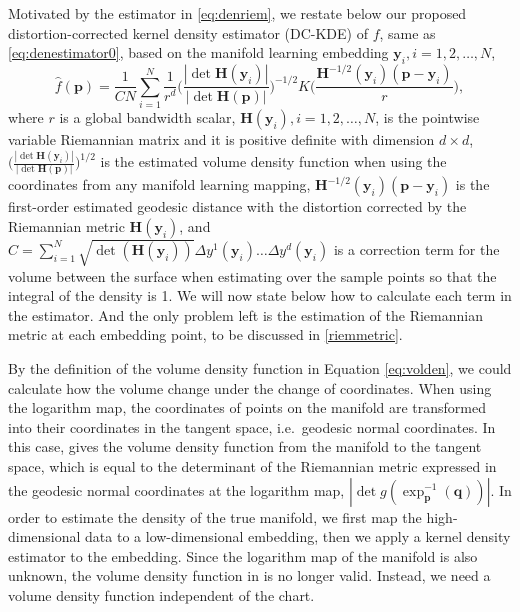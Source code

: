 \documentclass[11pt,a4paper,]{article}
\begin{document}
Motivated by the estimator in \eqref{eq:denriem}, we restate below our proposed distortion-corrected kernel density estimator (DC-KDE) of \(f\), same as \eqref{eq:denestimator0}, based on the manifold learning embedding \(\pmb{y}_i, i = 1, 2, \dots, N\),
\begin{equation}
\label{eq:denestimator}
\hat{f}(\pmb{p}) = \frac{1}{CN} \sum_{i=1}^{N} \frac{1}{r^d} \bigg(\frac{|\det \pmb{H}(\pmb{y}_i)|}{|\det \pmb{H}(\pmb{p})|} \bigg)^{-1/2} K\bigg( \frac{ \pmb{H}^{-1/2}(\pmb{y}_i) (\pmb{p} - \pmb{y}_i)}{r} \bigg),
\end{equation}
where \(r\) is a global bandwidth scalar, \(\pmb{H}(\pmb{y}_i), i = 1, 2, \dots, N\), is the pointwise variable Riemannian matrix and it is positive definite with dimension \(d\times d\), \(\bigg(\frac{|\det \pmb{H}(\pmb{y}_i)|}{|\det \pmb{H}(\pmb{p})|} \bigg)^{1/2}\) is the estimated volume density function when using the coordinates from any manifold learning mapping, \(\pmb{H}^{-1/2}(\pmb{y}_i) (\pmb{p} - \pmb{y}_i)\) is the first-order estimated geodesic distance with the distortion corrected by the Riemannian metric \(\pmb{H}(\pmb{y}_i)\), and \(C = \sum_{i=1}^{N} \sqrt{\det(\pmb{H}(\pmb{y}_i))} \Delta y^1(\pmb{y}_i)\dots \Delta y^d(\pmb{y}_i)\) is a correction term for the volume between the surface when estimating over the sample points so that the integral of the density is 1. We will now state below how to calculate each term in the estimator. And the only problem left is the estimation of the Riemannian metric at each embedding point, to be discussed in \autoref{riemmetric}.

By the definition of the volume density function in Equation \eqref{eq:volden}, we could calculate how the volume change under the change of coordinates. When using the logarithm map, the coordinates of points on the manifold are transformed into their coordinates in the tangent space, i.e.~geodesic normal coordinates. In this case, \textcite{Pelletier2005-vu} gives the volume density function from the manifold to the tangent space, which is equal to the determinant of the Riemannian metric expressed in the geodesic normal coordinates at the logarithm map, \(|\det g(\exp^{-1}_{\pmb{p}}(\pmb{q})) |\).
In order to estimate the density of the true manifold, we first map the high-dimensional data to a low-dimensional embedding, then we apply a kernel density estimator to the embedding. Since the logarithm map of the manifold is also unknown, the volume density function in \textcite{Pelletier2005-vu} is no longer valid. Instead, we need a volume density function independent of the chart.
\end{document}
